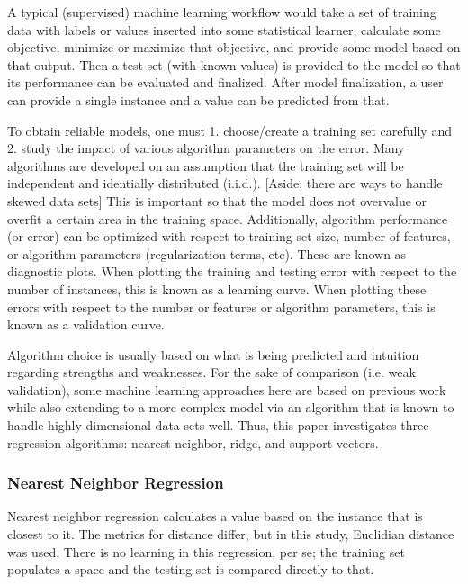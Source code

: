 \documentclass{anstrans}
\begin{document}
A typical (supervised) machine learning workflow would take a set of training
data with labels or values inserted into some statistical learner, calculate
some objective, minimize or maximize that objective, and provide some model
based on that output. Then a test set (with known values) is provided to the
model so that its performance can be evaluated and finalized. After model
finalization, a user can provide a single instance and a value can be predicted
from that. 

To obtain reliable models, one must 1. choose/create a training set carefully
and 2. study the impact of various algorithm parameters on the error. Many
algorithms are developed on an assumption that the training set will be
independent and identially distributed (i.i.d.). [Aside: there are ways to
handle skewed data sets] This is important so that the model does not overvalue
or overfit a certain area in the training space. Additionally, algorithm
performance (or error) can be optimized with respect to training set size,
number of features, or algorithm parameters (regularization terms, etc).  These
are known as diagnostic plots. When plotting the training and testing error
with respect to the number of instances, this is known as a learning curve.
When plotting these errors with respect to the number or features or algorithm
parameters, this is known as a validation curve. 

Algorithm choice is usually based on what is being predicted and intuition
regarding strengths and weaknesses.  For the sake of comparison (i.e. weak
validation), some machine learning approaches here are based on previous
work while also extending to a more complex model via an
algorithm that is known to handle highly dimensional data sets well. Thus, this
paper investigates three regression algorithms: nearest neighbor, ridge, and
support vectors.

\subsubsection{Nearest Neighbor Regression}


Nearest neighbor regression calculates a value based on the instance that is
closest to it. The metrics for distance differ, but in this study, Euclidian
distance was used. There is no learning in this regression, per se; the
training set populates a space and the testing set is compared directly to
that. 
\end{document}
